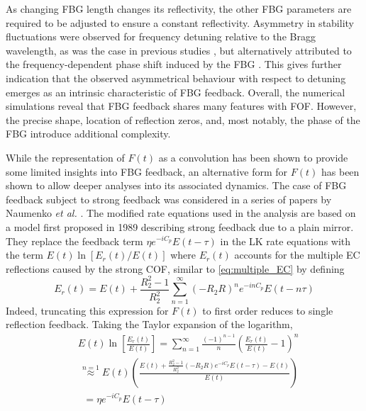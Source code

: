 As changing FBG length changes its reflectivity, the other FBG parameters are required to be adjusted to ensure a constant reflectivity. 
Asymmetry in stability fluctuations were observed for frequency detuning relative to the Bragg wavelength, as was the case in previous studies \cite{li2012distributed}, but alternatively attributed to the frequency-dependent phase shift induced by the FBG \cite{skenderas2024impact, skenderas2021feedback}. 
This gives further indication that the observed asymmetrical behaviour with respect to detuning emerges as an intrinsic characteristic of FBG feedback. Overall, the numerical simulations reveal that FBG feedback shares many features with FOF. 
However, the precise shape, location of reflection zeros, and, most notably, the phase of the FBG introduce additional complexity. 
%
\par
%
While the representation of $F(t)$ as a convolution has been shown to provide some limited insights into FBG feedback, an alternative form for $F(t)$ has been shown to allow deeper analyses into its associated dynamics. 
The case of FBG feedback subject to strong feedback was considered in a series of papers by Naumenko \textit{et al.} \cite{naumenko2003characteristics, naumenko2004slow, besnard2002intensity}. 
The modified rate equations used in the analysis are based on a model first proposed in 1989 \cite{rong1989improved} describing strong feedback due to a plain mirror. 
They replace the feedback term $\eta e^{-i C_p} E(t-\tau)$ in the LK rate equations with the term $E(t) \ln{\left[ E_r(t) / E(t) \right]}$ where $E_r(t)$ accounts for the multiple EC reflections caused by the strong COF, 
similar to \eqref{eq:multiple_EC} by defining
%
\begin{equation*}
    E_r(t) = E(t) + \frac{R_2^2 - 1}{R_2^2} \sum_{n=1}^\infty (-R_2 R)^n e^{-i n C_p} E(t-n \tau)
\end{equation*}
%
Indeed, truncating this expression for $F(t)$ to first order reduces to single reflection feedback. Taking the Taylor expansion of the logarithm,
%
\begin{equation*}
    \begin{aligned}
        &E(t) \ln{\left[ \frac{E_r(t)}{E(t)} \right]} = \sum_{n=1}^\infty \frac{(-1)^{n-1}}{n}\left( \frac{E_r(t)}{E(t)} - 1\right)^n \\
        &\,\overset{n=1}{\approx} E(t)\left( \frac{E(t) + \frac{R_2^2 - 1}{R_2^2}(-R_2 R)e^{-i C_p} E(t - \tau) - E(t)}{E(t)} \right)\\
        &\;\;= \eta e^{-i C_p} E(t - \tau)
    \end{aligned}   
\end{equation*}
